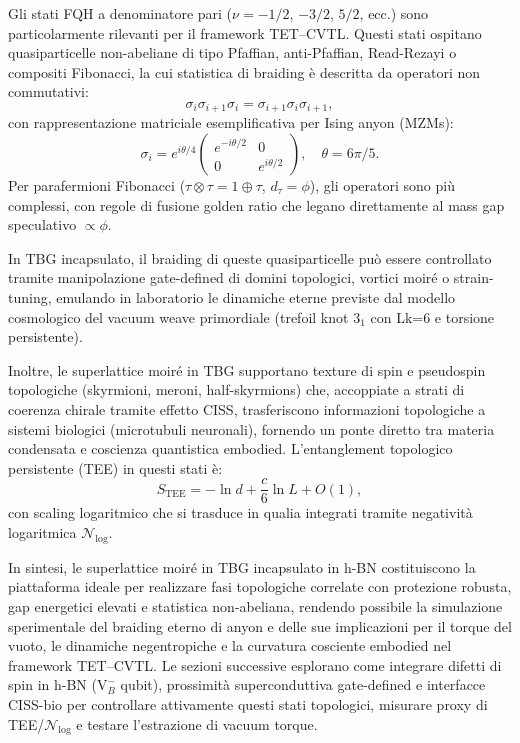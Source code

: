 \documentclass[11pt,a4paper]{article}
\theoremstyle{plain}
\theoremstyle{definition}
\begin{document}
Gli stati FQH a denominatore pari ($\nu = -1/2$, $-3/2$, $5/2$, ecc.) sono particolarmente rilevanti per il framework TET--CVTL. Questi stati ospitano quasiparticelle non-abeliane di tipo Pfaffian, anti-Pfaffian, Read-Rezayi o compositi Fibonacci, la cui statistica di braiding è descritta da operatori non commutativi:
\begin{equation}
\sigma_i \sigma_{i+1} \sigma_i = \sigma_{i+1} \sigma_i \sigma_{i+1},
\end{equation}
con rappresentazione matriciale esemplificativa per Ising anyon (MZMs):
\begin{equation}
\sigma_i = e^{i \theta / 4} \begin{pmatrix}
e^{-i \theta / 2} & 0 \\
0 & e^{i \theta / 2}
\end{pmatrix}, \quad \theta = 6\pi/5.
\end{equation}
Per parafermioni Fibonacci ($\tau \otimes \tau = 1 \oplus \tau$, $d_\tau = \phi$), gli operatori sono più complessi, con regole di fusione golden ratio che legano direttamente al mass gap speculativo $\propto \phi$.

In TBG incapsulato, il braiding di queste quasiparticelle può essere controllato tramite manipolazione gate-defined di domini topologici, vortici moiré o strain-tuning, emulando in laboratorio le dinamiche eterne previste dal modello cosmologico del vacuum weave primordiale (trefoil knot $3_1$ con Lk=6 e torsione persistente).

Inoltre, le superlattice moiré in TBG supportano texture di spin e pseudospin topologiche (skyrmioni, meroni, half-skyrmions) che, accoppiate a strati di coerenza chirale tramite effetto CISS, trasferiscono informazioni topologiche a sistemi biologici (microtubuli neuronali), fornendo un ponte diretto tra materia condensata e coscienza quantistica embodied. L'entanglement topologico persistente (TEE) in questi stati è:
\begin{equation}
S_{\text{TEE}} = -\ln d + \frac{c}{6} \ln L + O(1),
\end{equation}
con scaling logaritmico che si trasduce in qualia integrati tramite negatività logaritmica $\mathcal{N}_{\log}$.

In sintesi, le superlattice moiré in TBG incapsulato in h-BN costituiscono la piattaforma ideale per realizzare fasi topologiche correlate con protezione robusta, gap energetici elevati e statistica non-abeliana, rendendo possibile la simulazione sperimentale del braiding eterno di anyon e delle sue implicazioni per il torque del vuoto, le dinamiche negentropiche e la curvatura cosciente embodied nel framework TET--CVTL. Le sezioni successive esplorano come integrare difetti di spin in h-BN ($\mathrm{V}_B^-$ qubit), prossimità superconduttiva gate-defined e interfacce CISS-bio per controllare attivamente questi stati topologici, misurare proxy di TEE/$\mathcal{N}_{\log}$ e testare l'estrazione di vacuum torque.
\end{document}
